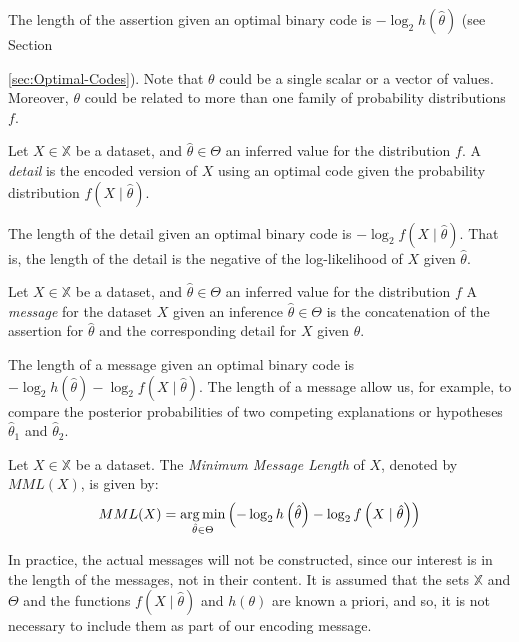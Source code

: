 The length of the assertion given an optimal binary code is $- \log_2 h(\hat\theta)$ (see Section {\ref{sec:Optimal-Codes}). Note that $\theta$ could be a single scalar or a vector of values. Moreover, $\theta$ could be related to more than one family of probability distributions $f$.

\begin{definition}
Let $X \in \mathbb{X}$ be a dataset, and $\hat \theta \in \Theta$ an inferred value for the distribution $f$. A \emph{detail} is the encoded version of $X$ using an optimal code given the probability distribution $f(X \mid \hat\theta)$.
\end{definition}

The length of the detail given an optimal binary code is $- \log_2 f( X \mid \hat\theta )$. That is, the length of the detail is the negative of the log-likelihood of $X$ given $\hat\theta$.

\begin{definition}
Let $X \in \mathbb{X}$ be a dataset, and $\hat \theta \in \Theta$ an inferred value for the distribution $f$ A \emph{message} for the dataset $X$ given an inference $\hat\theta \in \Theta$ is the concatenation of the assertion for $\hat\theta$ and the corresponding detail for $X$ given $\theta$.
\end{definition}

The length of a message given an optimal binary code is $- \log_2 h \left( \hat\theta \right) - \log_2 f \left( X \mid \hat\theta \right)$. The length of a message allow us, for example, to compare the posterior probabilities of two competing explanations or hypotheses $\hat\theta_1$ and $\hat\theta_2$.

\begin{definition}
Let $X \in \mathbb{X}$ be a dataset. The \emph{Minimum Message Length} of $X$, denoted by $MML(X)$, is given by:
\[
MML(X) = \operatorname*{arg\,min}_{\hat\theta \in \Theta} \left( - \log_2 h \left( \hat\theta \right) - \log_2 f \left( X \mid \hat\theta \right) \right)
\]

\end{definition}

In practice, the actual messages will not be constructed, since our interest is in the length of the messages, not in their content. It is assumed that the sets $\mathbb{X}$ and $\Theta$ and the functions $f(X \mid \hat\theta)$ and $h(\theta)$ are known a priori, and so, it is not necessary to include them as part of our encoding message.

}

